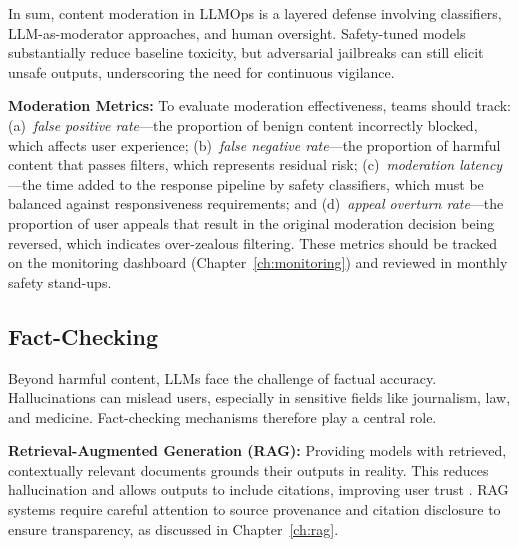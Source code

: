 
In sum, content moderation in LLMOps is a layered defense involving classifiers, LLM-as-moderator approaches, and human oversight. Safety-tuned models substantially reduce baseline toxicity, but adversarial jailbreaks can still elicit unsafe outputs, underscoring the need for continuous vigilance.

\textbf{Moderation Metrics:} To evaluate moderation effectiveness, teams should track: (a)~\emph{false positive rate}---the proportion of benign content incorrectly blocked, which affects user experience; (b)~\emph{false negative rate}---the proportion of harmful content that passes filters, which represents residual risk; (c)~\emph{moderation latency}---the time added to the response pipeline by safety classifiers, which must be balanced against responsiveness requirements; and (d)~\emph{appeal overturn rate}---the proportion of user appeals that result in the original moderation decision being reversed, which indicates over-zealous filtering. These metrics should be tracked on the monitoring dashboard (Chapter~\ref{ch:monitoring}) and reviewed in monthly safety stand-ups.

\subsection{Fact-Checking}

Beyond harmful content, LLMs face the challenge of factual accuracy. Hallucinations can mislead users, especially in sensitive fields like journalism, law, and medicine. Fact-checking mechanisms therefore play a central role.

\textbf{Retrieval-Augmented Generation (RAG):} Providing models with retrieved, contextually relevant documents grounds their outputs in reality. This reduces hallucination and allows outputs to include citations, improving user trust \cite{bcg2023}. RAG systems require careful attention to source provenance and citation disclosure to ensure transparency, as discussed in Chapter~\ref{ch:rag}.

